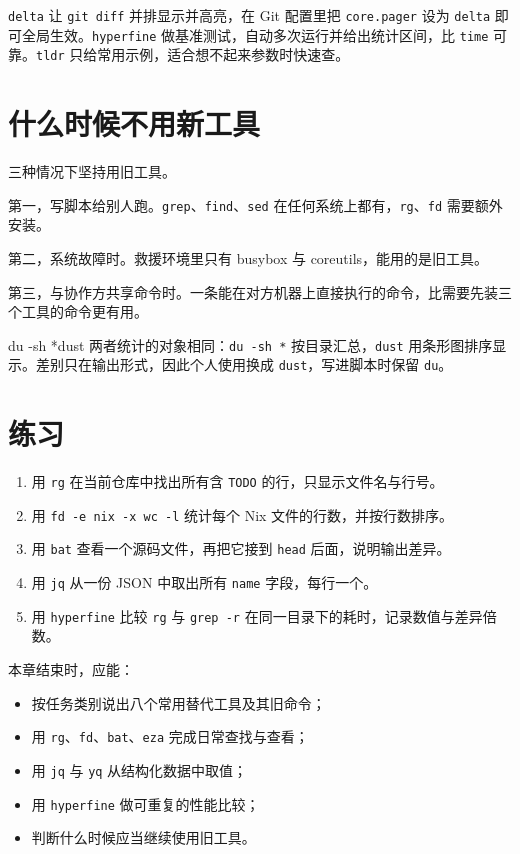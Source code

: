 \texttt{delta} 让 \texttt{git diff} 并排显示并高亮，在 Git 配置里把 \texttt{core.pager} 设为 \texttt{delta} 即可全局生效。\texttt{hyperfine} 做基准测试，自动多次运行并给出统计区间，比 \texttt{time} 可靠。\texttt{tldr} 只给常用示例，适合想不起来参数时快速查。

\section{什么时候不用新工具}

三种情况下坚持用旧工具。

第一，写脚本给别人跑。\texttt{grep}、\texttt{find}、\texttt{sed} 在任何系统上都有，\texttt{rg}、\texttt{fd} 需要额外安装。

第二，系统故障时。救援环境里只有 busybox 与 coreutils，能用的是旧工具。

第三，与协作方共享命令时。一条能在对方机器上直接执行的命令，比需要先装三个工具的命令更有用。

\begin{toolswap}{du -sh *}{dust}
两者统计的对象相同：\texttt{du -sh *} 按目录汇总，\texttt{dust} 用条形图排序显示。差别只在输出形式，因此个人使用换成 \texttt{dust}，写进脚本时保留 \texttt{du}。
\end{toolswap}

\section{练习}

\begin{enumerate}
  \item 用 \texttt{rg} 在当前仓库中找出所有含 \texttt{TODO} 的行，只显示文件名与行号。
  \item 用 \texttt{fd -e nix -x wc -l} 统计每个 Nix 文件的行数，并按行数排序。
  \item 用 \texttt{bat} 查看一个源码文件，再把它接到 \texttt{head} 后面，说明输出差异。
  \item 用 \texttt{jq} 从一份 JSON 中取出所有 \texttt{name} 字段，每行一个。
  \item 用 \texttt{hyperfine} 比较 \texttt{rg} 与 \texttt{grep -r} 在同一目录下的耗时，记录数值与差异倍数。
\end{enumerate}

\begin{checkpoint}
本章结束时，应能：
\begin{itemize}
  \item 按任务类别说出八个常用替代工具及其旧命令；
  \item 用 \texttt{rg}、\texttt{fd}、\texttt{bat}、\texttt{eza} 完成日常查找与查看；
  \item 用 \texttt{jq} 与 \texttt{yq} 从结构化数据中取值；
  \item 用 \texttt{hyperfine} 做可重复的性能比较；
  \item 判断什么时候应当继续使用旧工具。
\end{itemize}
\end{checkpoint}
